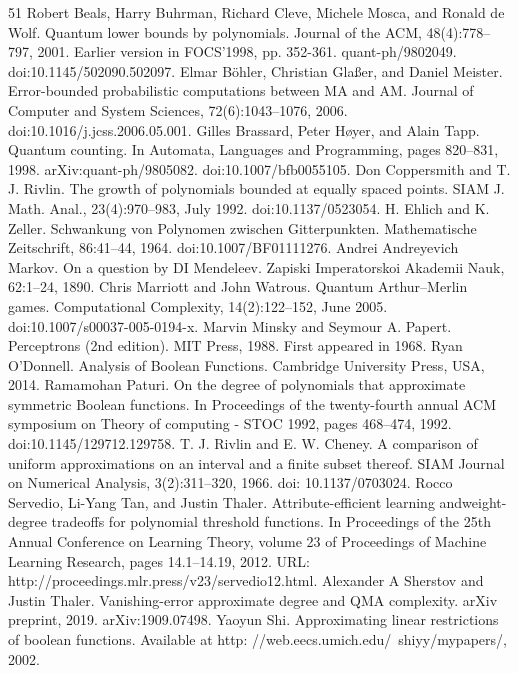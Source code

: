 \documentclass[10pt,a4paper]{article}
\newcommand{\<}{\langle}
\renewcommand{\>}{\rangle}
\begin{document}
\begin{thebibliography}{51}
 Robert Beals, Harry Buhrman, Richard Cleve, Michele Mosca, and Ronald de Wolf. Quantum lower bounds by polynomials. Journal of the ACM, 48(4):778–797, 2001. Earlier version in FOCS’1998, pp. 352-361. quant-ph/9802049. doi:10.1145/502090.502097.
 Elmar Böhler, Christian Glaßer, and Daniel Meister. Error-bounded probabilistic computations between MA and AM. Journal of Computer and System Sciences, 72(6):1043–1076, 2006. doi:10.1016/j.jcss.2006.05.001.
 Gilles Brassard, Peter Høyer, and Alain Tapp. Quantum counting. In Automata, Languages and Programming, pages 820–831, 1998. arXiv:quant-ph/9805082. doi:10.1007/bfb0055105.
 Don Coppersmith and T. J. Rivlin. The growth of polynomials bounded at equally spaced points. SIAM J. Math. Anal., 23(4):970–983, July 1992. doi:10.1137/0523054.
 H. Ehlich and K. Zeller. Schwankung von Polynomen zwischen Gitterpunkten. Mathematische Zeitschrift, 86:41–44, 1964. doi:10.1007/BF01111276.
 Andrei Andreyevich Markov. On a question by DI Mendeleev. Zapiski Imperatorskoi Akademii Nauk, 62:1–24, 1890.
 Chris Marriott and John Watrous. Quantum Arthur–Merlin games. Computational Complexity, 14(2):122–152, June 2005. doi:10.1007/s00037-005-0194-x.
 Marvin Minsky and Seymour A. Papert. Perceptrons (2nd edition). MIT Press, 1988. First appeared in 1968.
 Ryan O’Donnell. Analysis of Boolean Functions. Cambridge University Press, USA, 2014.
 Ramamohan Paturi. On the degree of polynomials that approximate symmetric Boolean functions. In Proceedings of the twenty-fourth annual ACM symposium on Theory of computing - STOC 1992, pages 468–474, 1992. doi:10.1145/129712.129758.
 T. J. Rivlin and E. W. Cheney. A comparison of uniform approximations on an interval and a finite subset thereof. SIAM Journal on Numerical Analysis, 3(2):311–320, 1966. doi: 10.1137/0703024.
 Rocco Servedio, Li-Yang Tan, and Justin Thaler. Attribute-efficient learning andweight-degree tradeoffs for polynomial threshold functions. In Proceedings of the 25th Annual Conference on Learning Theory, volume 23 of Proceedings of Machine Learning Research, pages 14.1–14.19, 2012. URL: http://proceedings.mlr.press/v23/servedio12.html.
 Alexander A Sherstov and Justin Thaler. Vanishing-error approximate degree and QMA complexity. arXiv preprint, 2019. arXiv:1909.07498.
 Yaoyun Shi. Approximating linear restrictions of boolean functions. Available at http: //web.eecs.umich.edu/~shiyy/mypapers/, 2002.
\end{thebibliography}
\end{document}
